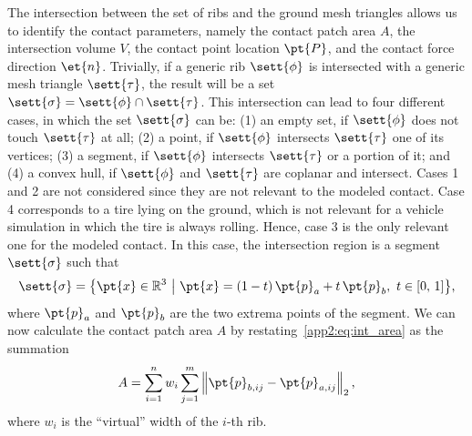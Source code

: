 The intersection between the set of ribs  and the ground mesh triangles  allows us to identify the contact parameters, namely the contact patch area $A$, the intersection volume $V$, the contact point location $\pt{P}$, and the contact force direction $\et{n}$. Trivially, if a generic rib $\sett{\phi}$ is intersected with a generic mesh triangle $\sett{\tau}$, the result will be a set $\sett{\sigma} = \sett{\phi} \cap \sett{\tau}$. This intersection can lead to four different cases, in which the set $\sett{\sigma}$ can be:
(1) an empty set, if $\sett{\phi}$ does not touch $\sett{\tau}$ at all;
(2) a point, if $\sett{\phi}$ intersects $\sett{\tau}$ one of its vertices;
(3) a segment, if $\sett{\phi}$ intersects $\sett{\tau}$ or a portion of it; and
(4) a convex hull, if $\sett{\phi}$ and $\sett{\tau}$ are coplanar and intersect.
%
%
Cases 1 and 2 are not considered since they are not relevant to the modeled contact. Case 4 corresponds to a tire lying on the ground, which is not relevant for a vehicle simulation in which the tire is always rolling. Hence, case 3 is the only relevant one for the modeled contact. In this case, the intersection region is a segment $\sett{\sigma}$ such that
%
\begin{equation*}
  \sett{\sigma} = \big\{ \pt{x}\in\mathbb{R}^3 ~ \big\lvert ~ \pt{x}=(1-t)\,\pt{p}_a + t\,\pt{p}_b, ~ t \in [0, \, 1] \big\}
  \text{,}
\end{equation*}
%
where $\pt{p}_a$ and $\pt{p}_b$ are the two extrema points of the segment. We can now calculate the contact patch area $A$ by restating~\eqref{app2:eq:int_area} as the summation
%
\begin{equation}
  A = \sum_{i=1}^{n} w_i \sum_{j=1}^{m} \left\|\pt{p}_{b,ij} - \pt{p}_{a,ij}\right\|_{2}
  \text{,}
  \label{app2:eq:int_a_crt}
\end{equation}
%
where $w_i$ is the ``virtual'' width of the $i$-th rib.

